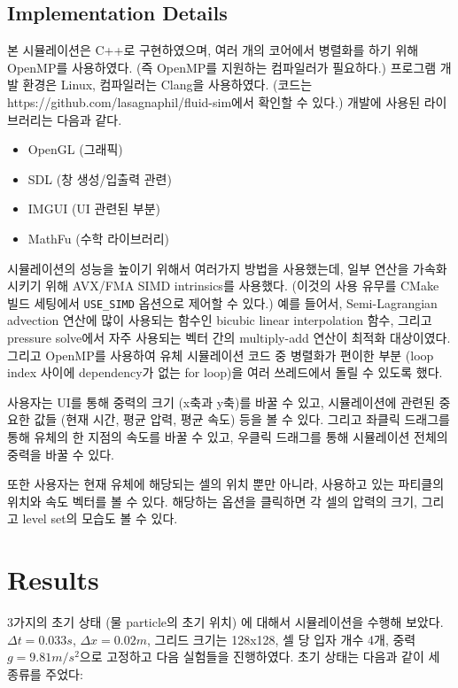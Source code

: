 \documentclass[12pt, A4]{article}
\begin{document}
\subsection{Implementation Details}

본 시뮬레이션은 C++로 구현하였으며, 여러 개의 코어에서 병렬화를 하기 위해 OpenMP를 사용하였다. (즉 OpenMP를 지원하는 컴파일러가 필요하다.) 프로그램 개발 환경은 Linux, 컴파일러는 Clang을 사용하였다. (코드는 https://github.com/lasagnaphil/fluid-sim에서 확인할 수 있다.) 개발에 사용된 라이브러리는 다음과 같다.

\begin{itemize}
  \item OpenGL (그래픽)
  \item SDL (창 생성/입출력 관련)
  \item IMGUI (UI 관련된 부분)
  \item MathFu (수학 라이브러리)
\end{itemize}

시뮬레이션의 성능을 높이기 위해서 여러가지 방법을 사용했는데, 일부 연산을 가속화시키기 위해 AVX/FMA SIMD intrinsics를 사용했다. (이것의 사용 유무를 CMake 빌드 세팅에서 \texttt{USE\_SIMD} 옵션으로 제어할 수 있다.) 예를 들어서, Semi-Lagrangian advection 연산에 많이 사용되는 함수인 bicubic linear interpolation 함수, 그리고 pressure solve에서 자주 사용되는 벡터 간의 multiply-add 연산이 최적화 대상이였다.  그리고 OpenMP를 사용하여 유체 시뮬레이션 코드 중 병렬화가 편이한 부분 (loop index 사이에 dependency가 없는 for loop)을 여러 쓰레드에서 돌릴 수 있도록 했다.

사용자는 UI를 통해 중력의 크기 (x축과 y축)를 바꿀 수 있고, 시뮬레이션에 관련된 중요한 값들 (현재 시간, 평균 압력, 평균 속도) 등을 볼 수 있다. 그리고 좌클릭 드래그를 통해 유체의 한 지점의 속도를 바꿀 수 있고, 우클릭 드래그를 통해 시뮬레이션 전체의 중력을 바꿀 수 있다.

또한 사용자는 현재 유체에 해당되는 셀의 위치 뿐만 아니라, 사용하고 있는 파티클의 위치와 속도 벡터를 볼 수 있다. 해당하는 옵션을 클릭하면 각 셀의 압력의 크기, 그리고 level set의 모습도 볼 수 있다.

\section{Results}

3가지의 초기 상태 (물 particle의 초기 위치) 에 대해서 시뮬레이션을 수행해 보았다.$\Delta t = 0.033s$, $\Delta x = 0.02m$, 그리드 크기는 128x128, 셀 당 입자 개수 4개, 중력 $g=9.81m/s^2$으로 고정하고 다음 실험들을 진행하였다. 초기 상태는 다음과 같이 세 종류를 주었다:
\end{document}
